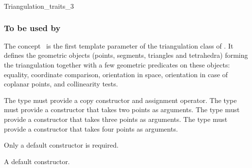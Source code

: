 

\begin{ccRefConcept}{Triangulation_traits_3}


\subsubsection{To be used by \protect {}}

\ccDefinition
The concept \ccRefName\ is the first template parameter of the
triangulation class  of \cgal. It
defines the geometric
objects (points, segments, triangles and tetrahedra) forming the
triangulation together with a few geometric predicates on these objects:
equality, coordinate comparison, orientation in space, orientation
in case of coplanar points, and collinearity tests.

\ccTypes
{}

{The type must provide a copy constructor and assignment operator.}
\ccGlue
{}
{The  type must provide a constructor that takes two points as arguments.}
\ccGlue
{}
{The type must provide a constructor that takes three points as
arguments.}
\ccGlue
{}
{The type must provide a constructor that takes four points as
arguments.}

\ccCreation
{}  %

Only a default constructor is required.

{A default constructor.}

\ccOperations


\end{ccRefConcept}
